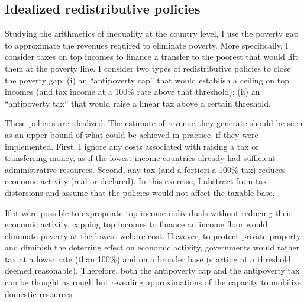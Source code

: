 \subsection{Idealized redistributive policies}

Studying the arithmetics of inequality at the country level, I use the poverty gap to approximate the revenues required to eliminate poverty. 
More specifically, I consider taxes on top incomes to finance a transfer to the poorest that would lift them at the poverty line. I consider two types of redistributive policies to close the poverty gap: (i) an ``antipoverty cap'' that would establish a ceiling on top incomes (and tax income at a 100\% rate above that threshold); (ii) an ``antipoverty tax'' that would raise a linear tax above a certain threshold. 

These policies are idealized. The estimate of revenue they generate should be seen as an upper bound of what could be achieved in practice, if they were implemented. %
First, I ignore any costs associated with raising a tax or transferring money, as if the lowest-income countries already had sufficient administrative resources. Second, any tax (and a fortiori a 100\% tax) reduces economic activity (real or declared). In this exercise, I abstract from tax distorsions and assume that the policies would not affect the taxable base.%

If it were possible to expropriate top income individuals 
without reducing their economic activity, capping top incomes to finance an income floor would eliminate poverty at the lowest welfare cost. 
However, to protect private property and diminish the deterring effect on economic activity, governments would rather tax at a lower rate (than 100\%) and on a broader base (starting at a threshold deemed reasonable). 
Therefore, both the antipoverty cap and the antipoverty tax can be thought as rough but revealing approximations of the capacity to mobilize domestic resources.


